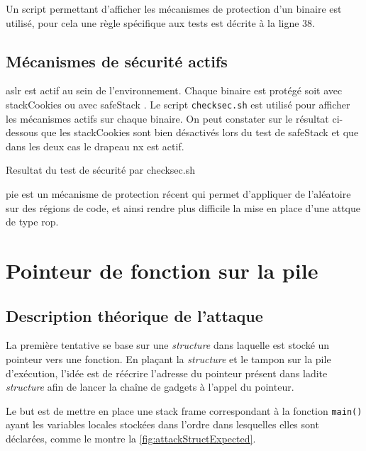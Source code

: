 Un script permettant d'afficher les mécanismes de protection d'un binaire est utilisé, pour cela une règle spécifique aux tests est décrite à la ligne 38.

\vfill

\subsection{Mécanismes de sécurité actifs}

\gls{aslr} est actif au sein de l'environnement. Chaque binaire est protégé soit avec \og \gls{stackCookies} \fg ou avec \og \gls{safeStack} \fg. Le script \texttt{checksec.sh} \cite{CheckSec} est utilisé pour afficher les mécanismes actifs sur chaque binaire. On peut constater sur le résultat ci-dessous que les \og \gls{stackCookies} \fg sont bien désactivés lors du test de \og \gls{safeStack} \fg et que dans les deux cas le drapeau \gls{nx} est actif.

\begin{listing}
	\caption{Resultat du test de sécurité par checksec.sh}
	\label{lst:checksecRes}
\end{listing}

\gls{pie} est un mécanisme de protection récent qui permet d'appliquer de l'aléatoire sur des régions de code, et ainsi rendre plus difficile la mise en place d'une attque de type \gls{rop}.


\section{Pointeur de fonction sur la pile}

\subsection{Description théorique de l'attaque}

La première tentative se base sur une \textit{structure} dans laquelle est stocké un pointeur vers une fonction. En plaçant la \textit{structure} et le tampon sur la pile d'exécution, l'idée est de réécrire l'adresse du pointeur présent dans ladite \textit{structure} afin de lancer la chaîne de gadgets à l'appel du pointeur.

Le but est de mettre en place une \og stack frame \fg correspondant à la fonction \texttt{main()} ayant les variables locales stockées dans l'ordre dans lesquelles elles sont déclarées, comme le montre la \autoref{fig:attackStructExpected}.

